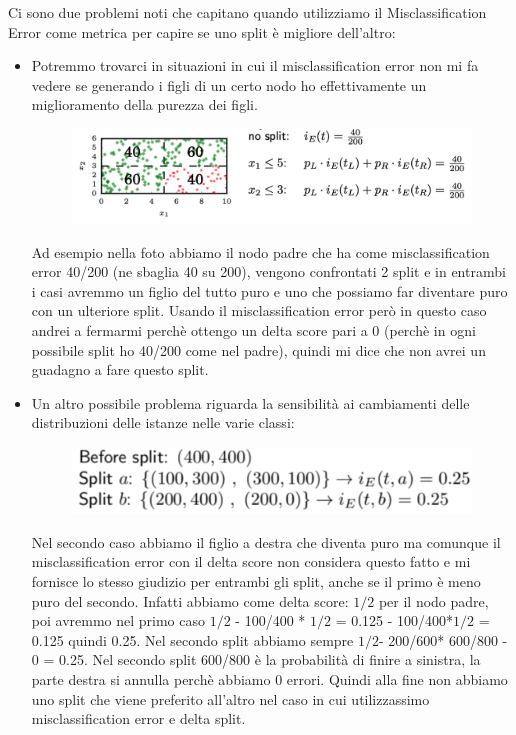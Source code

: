 \documentclass[14pt]{extreport}
\begin{document}
Ci sono due problemi noti che capitano quando utilizziamo il Misclassification Error come metrica per capire se uno split è migliore dell’altro:
\begin{itemize}
	\item Potremmo trovarci in situazioni in cui il misclassification error non mi fa vedere se generando i figli di un certo nodo ho effettivamente
	un miglioramento della purezza dei figli.


	      \begin{figure}[H]
		      \centering
		      \includegraphics[width=0.7\linewidth]{583.jpeg}
	      \end{figure}

	      Ad esempio nella foto abbiamo il nodo padre che ha come misclassification error 40/200 (ne sbaglia 40 su 200), vengono confrontati 2 split e
	      in entrambi i casi avremmo un figlio del tutto puro e uno che possiamo far diventare puro con un ulteriore split. Usando il
	      misclassification error però in questo caso andrei a fermarmi perchè ottengo un delta score pari a 0 (perchè in ogni possibile split ho
	      40/200 come nel padre), quindi mi dice che non avrei un guadagno a fare questo split.
	\item Un altro possibile problema riguarda la sensibilità ai cambiamenti delle distribuzioni delle istanze nelle varie classi:

	      \begin{figure}[H]
		      \centering
		      \includegraphics[width=0.7\linewidth]{584.jpeg}
	      \end{figure}
	      Nel secondo caso abbiamo il figlio a destra che diventa puro ma comunque il misclassification error con il delta score non considera questo
	      fatto e mi fornisce lo stesso giudizio per entrambi gli split, anche se il primo è meno puro del secondo. Infatti abbiamo come delta score:
	      $1/2$ per il nodo padre, poi avremmo nel primo caso $1/2$ - 100/400 * $1/2$ = 0.125 - 100/400*$1/2$ = 0.125 quindi 0.25. Nel secondo split
	      abbiamo sempre $1/2$- 200/600* 600/800  - 0 = 0.25. Nel secondo split 600/800 è la probabilità di finire a sinistra, la parte destra si
	      annulla perchè abbiamo 0 errori. Quindi alla fine non abbiamo uno split che viene preferito all’altro nel caso in cui utilizzassimo
	      misclassification error e delta split.

\end{itemize}
\end{document}

